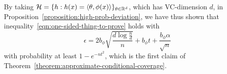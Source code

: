 \documentclass[11pt]{article}
\newcommand{\radphi}{b_{\phi}}
\newcommand{\scorerv}{S}
\begin{document}
By taking $\mathcal{H} = \{h : h(x) = \langle\theta, \phi(x)\rangle\}_{\theta \in \mathbb{R}^d}$,
which has VC-dimension $d$, in
Proposition~\ref{proposition:high-prob-deviation}, we have thus shown that
inequality~\eqref{eqn:one-sided-thing-to-prove} holds with
\begin{equation*}
  \epsilon = 
  2 \radphi \sqrt{\frac{d \log \frac{n}{d}}{n}} + \radphi t
  + \frac{\radphi \alpha}{\sqrt{n}}
\end{equation*}
with
probability at least $1 - e^{-nt^2}$, which is the first claim of
Theorem~\ref{theorem:approximate-conditional-coverage}.

\end{document}

